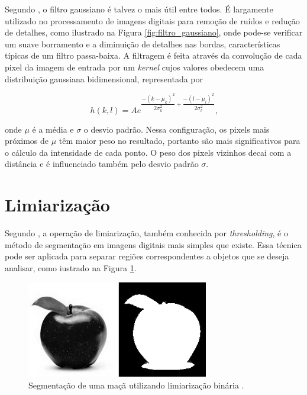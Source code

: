 Segundo \cite{opencv_doc:2013:online}, o filtro gaussiano é talvez o mais útil entre todos. É largamente utilizado no processamento de imagens digitais para remoção de ruídos e redução de detalhes, como ilustrado na Figura \ref{fig:filtro_gaussiano}, onde pode-se verificar um suave borramento e a diminuição de detalhes nas bordas, características típicas de um filtro passa-baixa. A filtragem é feita através da convolução de cada pixel da imagem de entrada por um \textit{kernel} cujos valores obedecem uma distribuição gaussiana bidimensional, representada por

\begin{equation}
  \label{eq:gaussian_blur}
  h(k,l)=Ae^{\dfrac{-(k-\mu_{k})^{2}}{2\sigma_{k}^{2}}+\dfrac{-(l-\mu_{l})^{2}}{2\sigma_{l}^{2}}}\text{,}
\end{equation}

\noindent onde $\mu$ é a média e $\sigma$ o desvio padrão. Nessa configuração, os pixels mais próximos de $\mu$ têm maior peso no resultado, portanto são mais significativos para o cálculo da intensidade de cada ponto. O peso dos pixels vizinhos decai com a distância e é influenciado também pelo desvio padrão $\sigma$.


\section{Limiarização} %
\label{sec:limiariza_o}

Segundo \cite{opencv:2008:book}, a operação de limiarização, também conhecida por \textit{thresholding}, é o método de segmentação em imagens digitais mais simples que existe. Essa técnica pode ser aplicada para separar regiões correspondentes a objetos que se deseja analisar, como iustrado na Figura \ref{fig:threshold_maca}.

\begin{figure}[ht]
  \begin{center}
    \includegraphics{imgs/threshold_maca.png}
  \end{center}
  \caption{Segmentação de uma maçã utilizando limiarização binária \citep{opencv_doc:2013:online}.}
  \label{fig:threshold_maca}
\end{figure}

